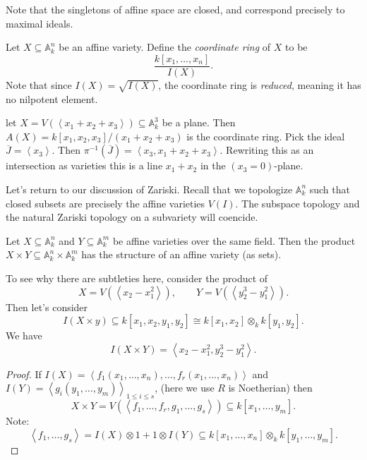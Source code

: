 
Note that the singletons of affine space are closed, and correspond precisely to maximal ideals.

\begin{definition}\label{dfn:coordinate-ring}
	Let $X\subseteq \mathbb{A} _k^n$ be an affine variety. Define the \emph{coordinate ring} of $X$ to be
	\[
		\frac{k[x_1, \ldots ,x_n]}{I(X)}
	.\]
	Note that since $I(X)=\sqrt{I(X)} $, the coordinate ring is \emph{reduced}, meaning it has no nilpotent element.
\end{definition}

let $X=V(\left\langle x_1+x_2+x_3 \right\rangle )\subseteq \mathbb{A} ^3_k$ be a plane. Then $A(X) = k[x_1,x_2,x_3] / (x_1+x_2+x_3)$ is the coordinate ring. Pick the ideal $\overline{J} =\left\langle x_3 \right\rangle $. Then $\pi ^{-1} (\overline{J} )=\left\langle x_3,x_1+x_2+x_3 \right\rangle $. Rewriting this as an intersection as varieties this is a line $x_1+x_2$ in the $(x_3=0)$-plane.

Let's return to our discussion of Zariski. Recall that we topologize $\mathbb{A} _k^n$ such that closed subsets are precisely the affine varieties $V(I)$. The subspace topology and the natural Zariski topology on a subvariety will coencide.

\begin{lemma}\label{lma:variety-product}
	Let $X\subseteq \mathbb{A}_k^n$ and $Y\subseteq \mathbb{A} _k^m$ be affine varieties over the same field. Then the product $X\times Y \subseteq \mathbb{A} _k^n \times \mathbb{A} _k^m$ has the structure of an affine variety (as sets).
\end{lemma}

To see why there are subtleties here, consider the product of
\[
	X=V(\left\langle x_2-x_1^2 \right\rangle ),\qquad Y=V(\left\langle y_2^3-y_1^2 \right\rangle )
.\]
Then let's consider
\[
	I(X\times y) \subseteq k[x_1,x_2,y_1,y_2] \cong k[x_1,x_2]\otimes_kk[y_1,y_2]
.\]
We have
\[
	I(X\times Y) = \left\langle x_2-x_1^2, y_2^3 - y_1^2 \right\rangle
.\]

\begin{proof}
	If $I(X)=\left\langle f_1(x_1, \ldots ,x_n) , \ldots ,f_r(x_1, \ldots ,x_n) \right\rangle $ and $I(Y) = \left\langle g_i(y_1, \ldots ,y_m) \right\rangle_{1\leq i\leq s} $, (here we use $R$ is Noetherian) then
	\[
		X\times Y=V(\left\langle f_1, \ldots ,f_r,g_1, \ldots ,g_s \right\rangle )\subseteq k[x_1, \ldots ,y_m]
	.\]
	Note:
	\[
		\left\langle f_1, \ldots ,g_s \right\rangle =I(X)\otimes 1+1\otimes I(Y) \subseteq k[x_1, \ldots ,x_n]\otimes _kk[y_1, \ldots ,y_m]
	.\]
\end{proof}


